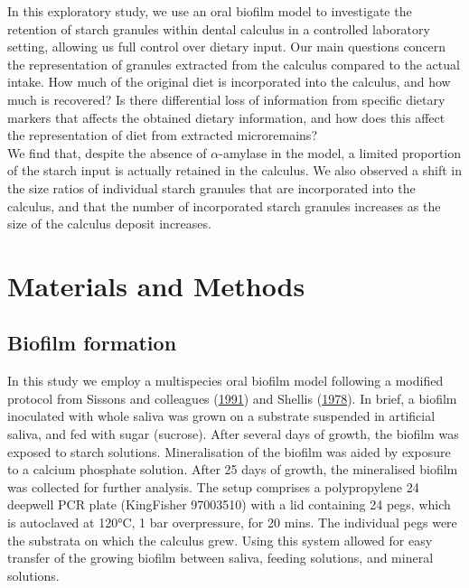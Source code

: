 \documentclass[
  letterpaper,
]{book}
\begin{document}
In this exploratory study, we use an oral biofilm model to investigate
the retention of starch granules within dental calculus in a controlled
laboratory setting, allowing us full control over dietary input. Our
main questions concern the representation of granules extracted from the
calculus compared to the actual intake. How much of the original diet is
incorporated into the calculus, and how much is recovered? Is there
differential loss of information from specific dietary markers that
affects the obtained dietary information, and how does this affect the
representation of diet from extracted microremains?\\
We find that, despite the absence of \(\alpha\)-amylase in the model, a
limited proportion of the starch input is actually retained in the
calculus. We also observed a shift in the size ratios of individual
starch granules that are incorporated into the calculus, and that the
number of incorporated starch granules increases as the size of the
calculus deposit increases.

\hypertarget{materials-and-methods-1}{%
\section{Materials and Methods}\label{materials-and-methods-1}}

\hypertarget{biofilm-formation}{%
\subsection{Biofilm formation}\label{biofilm-formation}}

In this study we employ a multispecies oral biofilm model following a
modified protocol from Sissons and colleagues
(\protect\hyperlink{ref-sissonsMultistationPlaque1991}{1991}) and
Shellis (\protect\hyperlink{ref-shellisSyntheticSaliva1978}{1978}). In
brief, a biofilm inoculated with whole saliva was grown on a substrate
suspended in artificial saliva, and fed with sugar (sucrose). After
several days of growth, the biofilm was exposed to starch solutions.
Mineralisation of the biofilm was aided by exposure to a calcium
phosphate solution. After 25 days of growth, the mineralised biofilm was
collected for further analysis. The setup comprises a polypropylene 24
deepwell PCR plate (KingFisher 97003510) with a lid containing 24 pegs,
which is autoclaved at 120°C, 1 bar overpressure, for 20 mins. The
individual pegs were the substrata on which the calculus grew. Using
this system allowed for easy transfer of the growing biofilm between
saliva, feeding solutions, and mineral solutions.
\end{document}
